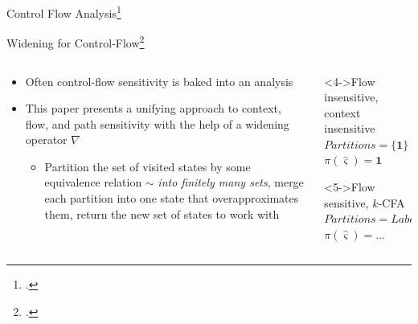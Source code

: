 \documentclass[aspectratio=169,14pt]{beamer}
\begin{document}
\begin{frame}{Control Flow Analysis\footcite{shivers1991control}}
\end{frame}

\begin{frame}{Widening for Control-Flow\footcite{hardekopf2014widening}}
  \footnotesize
  \begin{columns}
  \begin{column}{.55\textwidth}
  \begin{itemize}[<+->]
  \item Often control-flow sensitivity is baked into an analysis
  \item This paper presents a unifying approach to context, flow, and
    path sensitivity with the help of a widening operator $\nabla$
    \begin{itemize}\footnotesize
    \item Partition the set of visited states by some equivalence
      relation $\sim$ \emph{\alert<3>{into finitely many sets}}, merge each
      partition into one state that overapproximates them, return the
      new set of states to work with
    \end{itemize}
  \end{itemize}
\end{column}
\begin{column}{.45\textwidth}
\begin{exampleblock}<4->{\footnotesize Flow insensitive, context insensitive}
    \centering
    $Partitions = \{\mathbf{1}\}$\\
    $\pi(\hat\varsigma) = \mathbf{1}$
  \end{exampleblock}
  \begin{exampleblock}<5->{\footnotesize Flow sensitive, $k$-CFA}
    $Partitions = Label \times Label^k$\\
    \centering
    $\pi(\hat\varsigma) = \ldots$
  \end{exampleblock}
\end{column}
\end{columns}
\end{frame}
\end{document}
